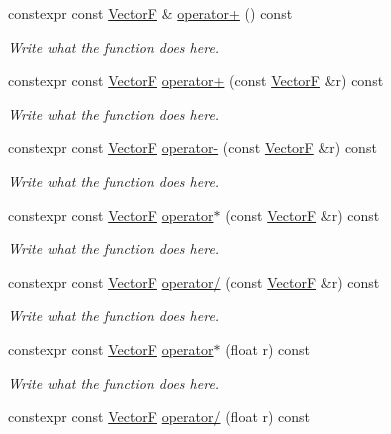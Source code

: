 \begin{DoxyCompactItemize}
constexpr const \hyperlink{structVectorF}{Vector\+F} \& \hyperlink{structVectorF_aad820d8b74b89970df0614f2dcfdf37c}{operator+} () const 
\begin{DoxyCompactList}\small\item\em Write what the function does here. \end{DoxyCompactList}\item 
constexpr const \hyperlink{structVectorF}{Vector\+F} \hyperlink{structVectorF_adb17836d5b5d7eeba62424c1d5f109e9}{operator+} (const \hyperlink{structVectorF}{Vector\+F} \&r) const 
\begin{DoxyCompactList}\small\item\em Write what the function does here. \end{DoxyCompactList}\item 
constexpr const \hyperlink{structVectorF}{Vector\+F} \hyperlink{structVectorF_aba20ab9c050dd441a9c3d0ec5fdde8ba}{operator-\/} (const \hyperlink{structVectorF}{Vector\+F} \&r) const 
\begin{DoxyCompactList}\small\item\em Write what the function does here. \end{DoxyCompactList}\item 
constexpr const \hyperlink{structVectorF}{Vector\+F} \hyperlink{structVectorF_a78cf7b725bb7724a8a3fb503baa129d7}{operator$\ast$} (const \hyperlink{structVectorF}{Vector\+F} \&r) const 
\begin{DoxyCompactList}\small\item\em Write what the function does here. \end{DoxyCompactList}\item 
constexpr const \hyperlink{structVectorF}{Vector\+F} \hyperlink{structVectorF_abb06f54310d9754e53d22e13073a706f}{operator/} (const \hyperlink{structVectorF}{Vector\+F} \&r) const 
\begin{DoxyCompactList}\small\item\em Write what the function does here. \end{DoxyCompactList}\item 
constexpr const \hyperlink{structVectorF}{Vector\+F} \hyperlink{structVectorF_a08f45eb79db6ea2dfdec066e366af752}{operator$\ast$} (float r) const 
\begin{DoxyCompactList}\small\item\em Write what the function does here. \end{DoxyCompactList}\item 
constexpr const \hyperlink{structVectorF}{Vector\+F} \hyperlink{structVectorF_a217a23d0ad4bcbe7d801d5df4399152f}{operator/} (float r) const 

\end{DoxyCompactItemize}
